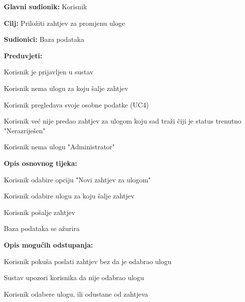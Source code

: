 					\noindent {}
					\begin{packed_item}
	
						\item \textbf{Glavni sudionik: }Korisnik
						\item  \textbf{Cilj:} Priložiti zahtjev za promjenu uloge
						\item  \textbf{Sudionici:} Baza podataka
						\item  \textbf{Preduvjeti:}
						\item[] \begin{packed_enum}
							\item Korisnik je prijavljen u sustav
							\item Korisnik nema ulogu za koju šalje zahtjev
							\item Korisnik pregledava svoje osobne podatke (UC4)
							\item Korisnik već nije predao zahtjev za ulogom koju sad traži čiji je status trenutno "Nerazriješen"
							\item Korisnik nema ulogu "Administrator"
							\end{packed_enum}
						\item  \textbf{Opis osnovnog tijeka:}
						
						\item[] \begin{packed_enum}
	
							\item Korisnik odabire opciju "Novi zahtjev za ulogom"
							\item Korisnik odabire ulogu za koju šalje zahtjev
							\item Korisnik pošalje zahtjev
							\item Baza podataka se ažurira
						\end{packed_enum}
						
						\item  \textbf{Opis mogućih odstupanja:}
						
						\item[] \begin{packed_item}
						
							\item[3.a] Korisnik pokuša poslati zahtjev bez da je odabrao ulogu
							\item[] \begin{packed_enum}
								
								\item Sustav upozori korisnika da nije odabrao ulogu
								\item Korisnik odabere ulogu, ili odustane od zahtjeva
								

\end{packed_enum}
\end{packed_item}
\end{packed_item}

